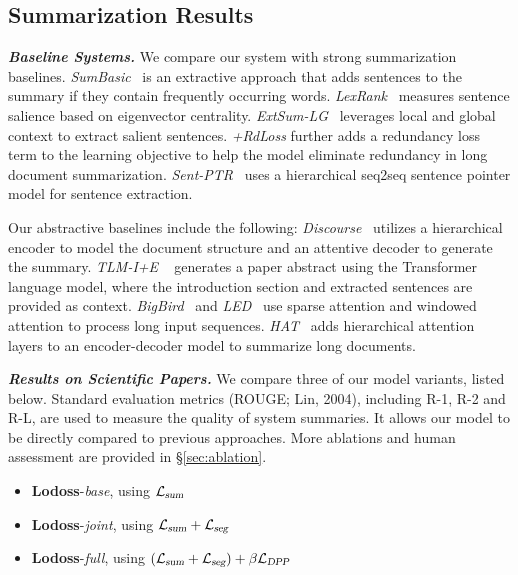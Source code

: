 \documentclass[11pt]{article}
\begin{document}
\subsection{Summarization Results}
\label{sec:results}

\noindent\textbf{\textsl{Baseline Systems.}}\quad
We compare our system with strong summarization baselines.
\textsl{SumBasic}~\cite{Vanderwende:2007} is an extractive approach that adds sentences to the summary if they contain frequently occurring words.
\textsl{LexRank}~\cite{Erkan:2004} measures sentence salience based on eigenvector centrality.
\textsl{ExtSum-LG}~\cite{xiao-carenini-2019-extractive,xiao-carenini-2020-systematically} leverages local and global context to extract salient sentences.
\textsl{+RdLoss} further adds a redundancy loss term to the learning objective to help the model eliminate redundancy in long document summarization.
\textsl{Sent-PTR}~\cite{pilault-etal-2020-extractive} uses a hierarchical seq2seq sentence pointer model for sentence extraction.


Our abstractive baselines include the following:
\textsl{Discourse}~\cite{cohan-etal-2018-discourse} utilizes a hierarchical encoder to model the document structure and an attentive decoder to generate the summary.
\textsl{TLM-I+E} ~\cite{pilault-etal-2020-extractive} generates a paper abstract using the Transformer language model, where the introduction section and extracted sentences are provided as context.
\textsl{BigBird}~\cite{zaheer2020bigbird} and \textit{LED}~\cite{Beltagy:2020} use sparse attention and windowed attention to process long input sequences.
\textsl{HAT}~\cite{Rohde-etal_2020} adds hierarchical attention layers to an encoder-decoder model to summarize long documents. 

\vspace{0.05in}
\noindent\textbf{\textsl{Results on Scientific Papers.}}\quad
We compare three of our model variants, listed below. 
Standard evaluation metrics (ROUGE; Lin, 2004)\nocite{lin-2004-rouge},
including R-1, R-2 and R-L, are used to measure the quality of system summaries.
It allows our model to be directly compared to previous approaches.
More ablations and human assessment are provided in \S\ref{sec:ablation}.
\begin{itemize}[topsep=3pt,itemsep=0pt,leftmargin=*]
\item \textbf{Lodoss}-\emph{base}, using $\mathcal{L}_{\textsl{sum}}$
\item \textbf{Lodoss}-\emph{joint}, using $\mathcal{L}_{\textsl{sum}}+\mathcal{L}_{\textsl{seg}}$
\item \textbf{Lodoss}-\emph{full}, using $(\mathcal{L}_{\textsl{sum}}+\mathcal{L}_{\textsl{seg}})+\beta\mathcal{L}_{\textsl{DPP}}$
\end{itemize}
\end{document}
